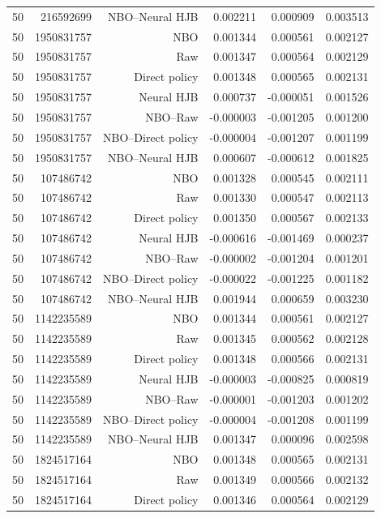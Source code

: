 \begin{longtable}{lrrrrr}
50 & 216592699 & NBO--Neural HJB & 0.002211 & 0.000909 & 0.003513 \\
50 & 1950831757 & NBO & 0.001344 & 0.000561 & 0.002127 \\
50 & 1950831757 & Raw & 0.001347 & 0.000564 & 0.002129 \\
50 & 1950831757 & Direct policy & 0.001348 & 0.000565 & 0.002131 \\
50 & 1950831757 & Neural HJB & 0.000737 & -0.000051 & 0.001526 \\
50 & 1950831757 & NBO--Raw & -0.000003 & -0.001205 & 0.001200 \\
50 & 1950831757 & NBO--Direct policy & -0.000004 & -0.001207 & 0.001199 \\
50 & 1950831757 & NBO--Neural HJB & 0.000607 & -0.000612 & 0.001825 \\
50 & 107486742 & NBO & 0.001328 & 0.000545 & 0.002111 \\
50 & 107486742 & Raw & 0.001330 & 0.000547 & 0.002113 \\
50 & 107486742 & Direct policy & 0.001350 & 0.000567 & 0.002133 \\
50 & 107486742 & Neural HJB & -0.000616 & -0.001469 & 0.000237 \\
50 & 107486742 & NBO--Raw & -0.000002 & -0.001204 & 0.001201 \\
50 & 107486742 & NBO--Direct policy & -0.000022 & -0.001225 & 0.001182 \\
50 & 107486742 & NBO--Neural HJB & 0.001944 & 0.000659 & 0.003230 \\
50 & 1142235589 & NBO & 0.001344 & 0.000561 & 0.002127 \\
50 & 1142235589 & Raw & 0.001345 & 0.000562 & 0.002128 \\
50 & 1142235589 & Direct policy & 0.001348 & 0.000566 & 0.002131 \\
50 & 1142235589 & Neural HJB & -0.000003 & -0.000825 & 0.000819 \\
50 & 1142235589 & NBO--Raw & -0.000001 & -0.001203 & 0.001202 \\
50 & 1142235589 & NBO--Direct policy & -0.000004 & -0.001208 & 0.001199 \\
50 & 1142235589 & NBO--Neural HJB & 0.001347 & 0.000096 & 0.002598 \\
50 & 1824517164 & NBO & 0.001348 & 0.000565 & 0.002131 \\
50 & 1824517164 & Raw & 0.001349 & 0.000566 & 0.002132 \\
50 & 1824517164 & Direct policy & 0.001346 & 0.000564 & 0.002129 \\

\end{longtable}
